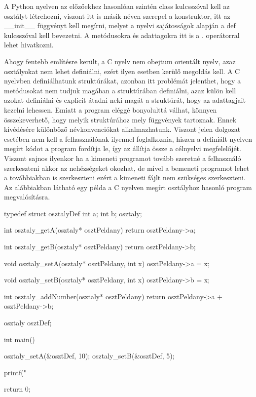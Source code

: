 A Python nyelven az előzőekhez hasonlóan szintén class kulcsszóval kell az osztályt létrehozni, viszont itt is másik néven szerepel a konstruktor, itt az \_\_init\_\_ függvényt kell megírni, melyet a nyelvi sajátosságok alapján a def kulcsszóval kell bevezetni. A metódusokra és adattagokra itt is a . operátorral lehet hivatkozni.

Ahogy fentebb említésre került, a C nyelv nem obejtum orientált nyelv, azaz osztályokat nem lehet definiálni, ezért ilyen esetben kerülő megoldás kell. A C nyelvben definiálhatunk struktúrákat, azonban itt problémát jelenthet, hogy a metódusokat nem tudjuk magában a struktúrában definiálni, azaz külön kell azokat definiálni és explicit átadni neki magát a struktúrát, hogy az adattagjait kezelni lehessen. Emiatt a program eléggé bonyolulttá válhat, könnyen összekeverhető, hogy melyik struktúrához mely függvények tartoznak. Ennek kivédésére különböző névkonvenciókat alkalmazhatunk. Viszont jelen dolgozat esetében nem kell a felhasználónak ilyennel foglalkoznia, hiszen a definiált nyelven megírt kódot a program fordítja le, így az állítja össze a célnyelvi megfelelőjét. Viszont sajnos ilyenkor ha a kimeneti programot tovább szeretné a felhasználó szerkeszteni akkor az nehézségeket okozhat, de mivel a bemeneti programot lehet a továbbiakban is szerkeszteni ezért a kimeneti fájlt nem szükséges szerkeszteni.
Az alábbiakban látható egy példa a C nyelven megírt osztályhoz hasonló program megvalósításra.

\begin{cpp}
	typedef struct osztalyDef {
		int a;
		int b;
	} osztaly;
	
	int osztaly_getA(osztaly* osztPeldany) {
		return osztPeldany->a;
	}
	
	int osztaly_getB(osztaly* osztPeldany) {
		return osztPeldany->b;
	}
	
	void osztaly_setA(osztaly* osztPeldany, int x) {
		osztPeldany->a = x;
	}
	
	void osztaly_setB(osztaly* osztPeldany, int x) {
		osztPeldany->b = x;
	}
	
	int osztaly_addNumber(osztaly* osztPeldany) {
		return osztPeldany->a + osztPeldany->b;
	}
	
	osztaly osztDef;
	
	int main()
	{
		osztaly_setA(&osztDef, 10);
		osztaly_setB(&osztDef, 5);
		
		printf("%
		
		return 0;
	}
\end{cpp}


